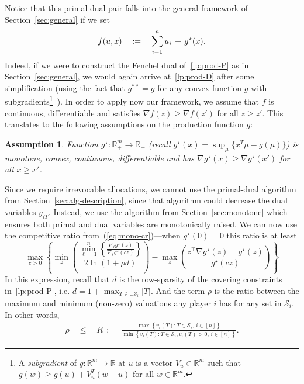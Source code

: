 \documentclass[letterpaper,11pt]{article}
\newtheorem{assumption}[thm]{Assumption}
\def \RR   {{\mathbb R}}
\newcommand{\trans}{\intercal}
\def\cS{\mathcal{S}}
\begin{document}
Notice that this primal-dual pair falls into the general framework of
Section~\ref{sec:general} if we set
\begin{gather*}
  f(u,x)\quad :=\quad \sum_{i=1}^{n} u_i \,+\, g^\star(x).
\end{gather*}
Indeed, if we were to construct the Fenchel dual of~\eqref{lp:prod-P} as in
Section~\ref{sec:general}, we would again arrive at~\eqref{lp:prod-D}
after some simplification (using the fact that $g^{**}=g$ for any convex
function $g$ with subgradients\footnote{A \emph{subgradient} of
  $g:\RR^m\rightarrow \RR$ at $u$ is a vector $V_u\in \RR^m$ such that
  $g(w)\ge g(u)+V_u^T (w-u)$ for all $w\in \RR^m$.}~\cite{Rock}). In
order to apply now our framework, we assume that $f$ is continuous,
differentiable and satisfies $\nabla f(z) \ge \nabla f(z')$ for all
$z\ge z'$. This translates to the following assumptions on the
production function $g$:
\begin{assumption}
  \label{asm:g-mono}
  Function $g^\star:\RR^m_+\rightarrow \RR_+$ (recall $g^\star(x)=\sup_\mu
  \{x^T\mu-g(\mu)\}$) is monotone, convex, continuous, differentiable
  and has $\nabla g^\star(x) \ge \nabla g^\star(x')$ for all $x\ge x'$.
\end{assumption}

Since we require irrevocable allocations, we cannot use the primal-dual
algorithm from Section~\ref{sec:alg-description}, since that algorithm could
decrease the dual variables $y_{iT}$. Instead, we use the algorithm from
Section~\ref{sec:monotone} which ensures both primal and dual
variables are monotonically raised. We can now use the competitive ratio
from~(\ref{eq:mono-cr})---when $g^\star(0)=0$ this ratio is at least
\begin{equation}
\max_{c > 0}\left\{ \min_{z} \left(\frac{\min_{\ell=1}^{n}\left\{\frac{\nabla_\ell g^\star(z)}{\nabla_\ell g^\star(cz)}\right\}}{2\ln(1+\rho d)}\right) - \max_{z}
\left(\frac{ z^\trans \nabla g^\star(z) - g^\star(z)
  }{g^\star(c z)}\right) \right\} \label{eq:prod-comp-ratio}
\end{equation}
In this expression, recall that $d$ is the row-sparsity of the covering
constraints in~\eqref{lp:prod-P}, i.e. $d=1+\max_{T\in \cup \cS_i} |T|$. And the term $\rho$ is the ratio
between the maximum and minimum (non-zero) valuations any player $i$ has
for any set in $\cS_i$. In other words,
\begin{gather}
  \rho \quad \le \quad R\,:=\, \,\, \frac{ \max \left\{ v_i(T) : T\in
      \cS_i,\, i\in [n]\right\}}{\min \left\{v_i(T) : T\in \cS_i,
      v_i(T)>0,\, i\in [n]\right\}}. \label{eq:def-R}
\end{gather}
\end{document}
